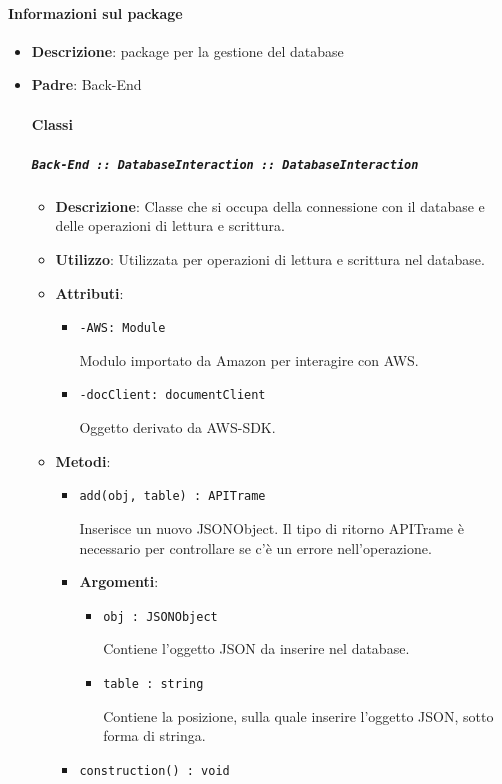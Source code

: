 \documentclass[../DefinizioneDiProdotto.tex]{subfiles}
\begin{document}
	\paragraph{Informazioni sul package}\begin{itemize}\item \textbf{Descrizione}: package per la gestione del database\item \textbf{Padre}: Back-End\paragraph{Classi}
	\subparagraph{\texttt{Back-End :: DatabaseInteraction :: DatabaseInteraction}}
	\begin{itemize}\item \textbf{Descrizione}: Classe che si occupa della connessione con il database e delle operazioni di lettura e scrittura.
	\item \textbf{Utilizzo}: Utilizzata per operazioni di lettura e scrittura nel database.
	\item \textbf{Attributi}:
	\begin{itemize}
	\item \texttt{-AWS: Module}\

	 Modulo importato da Amazon per interagire con AWS.
	\end{itemize}
	\begin{itemize}
	\item \texttt{-docClient: documentClient}\

	 Oggetto derivato da AWS-SDK.
	\end{itemize}
	\item \textbf{Metodi}:
	\begin{itemize}
	\item \texttt{add(obj, table) : APITrame}\

	 Inserisce un nuovo JSONObject. Il tipo di ritorno APITrame è necessario per controllare se c'è un errore nell'operazione.

	\item \textbf{Argomenti}:
	\begin{itemize}
	\item \texttt{obj : JSONObject}\

	 Contiene l'oggetto JSON da inserire nel database.
	\item \texttt{table : string}\

	 Contiene la posizione, sulla quale inserire l'oggetto JSON, sotto forma di stringa.
	\end{itemize}
	\end{itemize}\vspace{0.5em}
	\begin{itemize}
	\item \texttt{construction() : void}\


\end{itemize}
\end{itemize}
\end{itemize}
\end{document}
